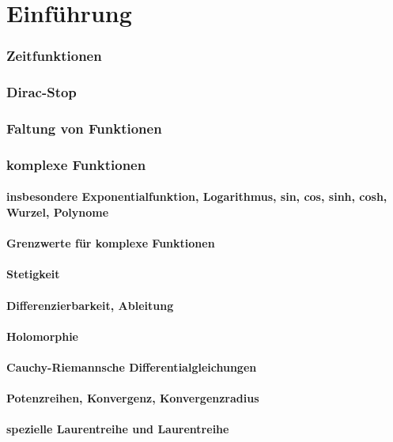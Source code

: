\part{Einführung}
\section{Zeitfunktionen}
\section{Dirac-Stop}
\section{Faltung von Funktionen}
\section{komplexe Funktionen}
\subsection{insbesondere Exponentialfunktion, Logarithmus, sin, cos, sinh, cosh, Wurzel, Polynome}
\subsection{Grenzwerte für komplexe Funktionen}
\subsection{Stetigkeit}
\subsection{Differenzierbarkeit, Ableitung}
\subsection{Holomorphie}
\subsection{Cauchy-Riemannsche Differentialgleichungen}
\subsection{Potenzreihen, Konvergenz, Konvergenzradius}
\subsection{spezielle Laurentreihe und Laurentreihe}
